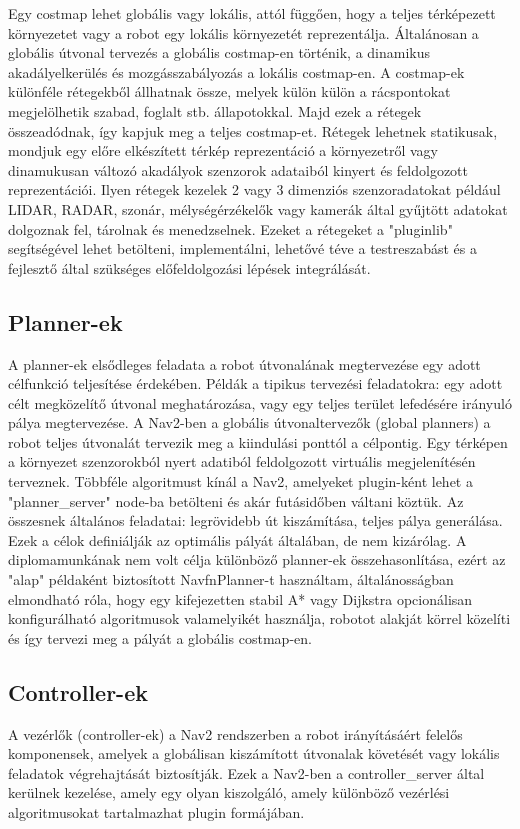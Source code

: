 Egy costmap lehet globális vagy lokális, attól függően, hogy a teljes térképezett környezetet vagy a robot egy lokális környezetét reprezentálja. Általánosan a globális útvonal tervezés a globális costmap-en történik, a dinamikus akadályelkerülés és mozgásszabályozás a lokális costmap-en. A costmap-ek különféle rétegekből állhatnak össze, melyek külön külön a rácspontokat megjelölhetik szabad, foglalt stb. állapotokkal. Majd ezek a rétegek összeadódnak, így kapjuk meg a teljes costmap-et. Rétegek lehetnek statikusak, mondjuk egy előre elkészített térkép reprezentáció a környezetről vagy dinamukusan változó akadályok szenzorok adataiból kinyert és feldolgozott reprezentációi. Ilyen rétegek kezelek 2 vagy 3 dimenziós szenzoradatokat például LIDAR, RADAR, szonár, mélységérzékelők vagy kamerák által gyűjtött adatokat dolgoznak fel, tárolnak és menedzselnek. Ezeket a rétegeket a "pluginlib" segítségével lehet betölteni, implementálni, lehetővé téve a testreszabást és a fejlesztő által szükséges előfeldolgozási lépések integrálását. \cite{nav2}

\subsection{Planner-ek}
A planner-ek elsődleges feladata a robot útvonalának megtervezése egy adott célfunkció teljesítése érdekében. Példák a tipikus tervezési feladatokra: egy adott célt megközelítő útvonal meghatározása, vagy egy teljes terület lefedésére irányuló pálya megtervezése. A Nav2-ben a globális útvonaltervezők (global planners) a robot teljes útvonalát tervezik meg a kiindulási ponttól a célpontig. Egy térképen a környezet szenzorokból nyert adatiból feldolgozott virtuális megjelenítésén terveznek. Többféle algoritmust kínál a Nav2, amelyeket plugin-ként lehet a "planner\_server" node-ba betölteni és akár futásidőben váltani köztük. Az összesnek általános feladatai: legrövidebb út kiszámítása, teljes pálya generálása. Ezek a célok definiálják az optimális pályát általában, de nem kizárólag. A diplomamunkának nem volt célja különböző planner-ek összehasonlítása, ezért az "alap" példaként biztosított NavfnPlanner-t használtam, általánosságban elmondható róla, hogy egy kifejezetten stabil A* vagy Dijkstra opcionálisan konfigurálható algoritmusok valamelyikét használja, robotot alakját körrel közelíti és így tervezi meg a pályát a globális costmap-en. \cite{nav2}

\subsection{Controller-ek}
A vezérlők (controller-ek) a Nav2 rendszerben a robot irányításáért felelős komponensek, amelyek a globálisan kiszámított útvonalak követését vagy lokális feladatok végrehajtását biztosítják. Ezek a Nav2-ben a controller\_server által kerülnek kezelése, amely egy olyan kiszolgáló, amely különböző vezérlési algoritmusokat tartalmazhat plugin formájában.

